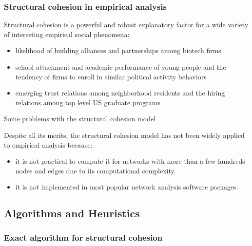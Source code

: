 \documentclass[ignorenonframetext,red,8pt,notes=show]{beamer}
\begin{document}
\begin{frame}
\frametitle{Structural cohesion in empirical analysis}

Structural cohesion is a powerful and robust explanatory factor for a wide variety of interesting empirical social phenomena: 

\begin{itemize}

\item likelihood of building alliances and partnerships among biotech firms \citep{powell:2005}

\item school attachment and academic performance of young people and the tendency of firms to enroll in similar political activity behaviors \citep{moody:2003}

\item emerging trust relations among neighborhood residents and the hiring relations among top level US graduate programs \citep{grannis:2009}

\end{itemize}

\begin{block}{Some problems with the structural cohesion model}

Despite all its merits, the structural cohesion model has not been widely applied to empirical analysis because:

\begin{itemize}

\item it is not practical to compute it for networks with more than a few hundreds nodes and edges due to its computational complexity.

\item it is not implemented in most popular network analysis software packages.

\end{itemize}
\end{block}
\end{frame}

\subsection{Algorithms and Heuristics}

\subsubsection{Exact algorithm for structural cohesion}
\end{document}
